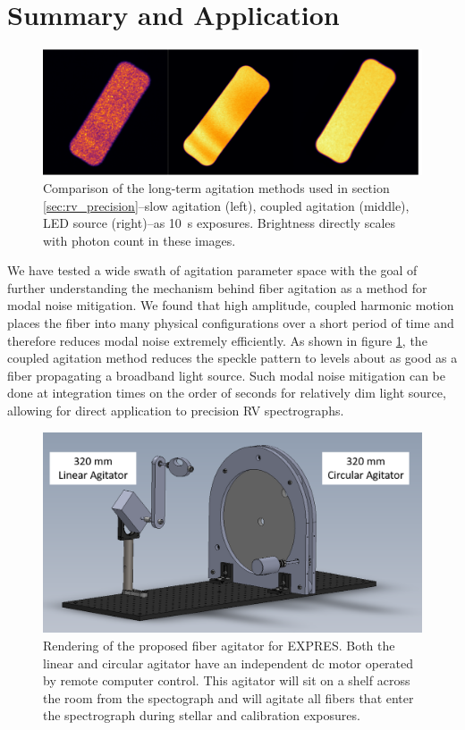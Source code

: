 \documentclass[twocolumn]{emulateapj}
\begin{document}
\section{Summary and Application}
\label{sec:conclusions}

\begin{figure}
\centering
	\includegraphics[width=\columnwidth]{images/fiber_rv_error.pdf}
	\caption{Comparison of the long-term agitation methods used in section \ref{sec:rv_precision}--slow agitation (left), coupled agitation (middle), LED source (right)--as \SI{10}{\second} exposures. Brightness directly scales with photon count in these images.}
\label{fig:fiber_rv_error}
\end{figure}

We have tested a wide swath of agitation parameter space with the goal of further understanding the mechanism behind fiber agitation as a method for modal noise mitigation. We found that high amplitude, coupled harmonic motion places the fiber into many physical configurations over a short period of time and therefore reduces modal noise extremely efficiently. As shown in figure \ref{fig:fiber_rv_error}, the coupled agitation method reduces the speckle pattern to levels about as good as a fiber propagating a broadband light source. Such modal noise mitigation can be done at integration times on the order of seconds for relatively dim light source, allowing for direct application to precision RV spectrographs.

\begin{figure}
\centering
	\includegraphics[width=\columnwidth]{images/agitator_model.png}
	\caption{Rendering of the proposed fiber agitator for EXPRES. Both the linear and circular agitator have an independent dc motor operated by remote computer control. This agitator will sit on a shelf across the room from the spectograph and will agitate all fibers that enter the spectrograph during stellar and calibration exposures.}
\label{fig:agitator_model}
\end{figure}
\end{document}
